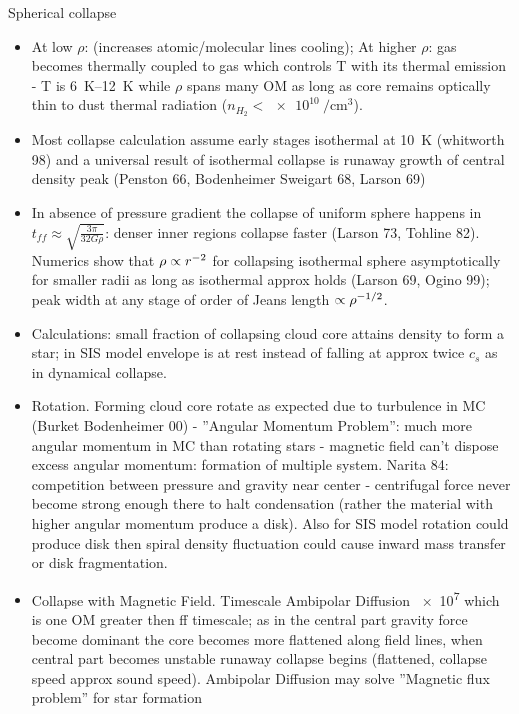 \begin{frame}{Spherical collapse}
    \begin{itemize}
        \item At low $\rho$: \xaumenta{\rho}  (increases atomic/molecular lines cooling); At higher $\rho$: gas becomes thermally coupled to gas which controls T with its thermal emission - T is \SIrange{6}{12}{\kelvin} while $\rho$ spans many OM as long as core remains optically thin to dust thermal radiation ($n_{H_2}<\SI{e10}{\per\cubic\cm}$).
        \item Most collapse calculation assume early stages isothermal at \SI{10}{\kelvin} (whitworth 98) and a universal result of isothermal collapse is runaway growth of central density peak (Penston 66, Bodenheimer Sweigart 68, Larson 69)
        \item In absence of pressure gradient the collapse of uniform sphere happens in $t_{ff}\approx\sqrt{\frac{3\pi}{32G\rho}}$: denser inner regions collapse faster (Larson 73, Tohline 82). Numerics show that $\rho\propto r^{-2}$ for collapsing isothermal sphere asymptotically for smaller radii as long as isothermal approx holds (Larson 69, Ogino 99); peak width at any stage of order of Jeans length $\propto\rho^{-1/2}$.
        \item Calculations: small fraction of collapsing cloud core attains density to form a star; in SIS model envelope is at rest instead of falling at approx twice $c_s$ as in dynamical collapse.
        \item Rotation. Forming cloud core rotate as expected due to turbulence in MC (Burket Bodenheimer 00) - ''Angular Momentum Problem'': much more angular momentum in MC than rotating stars - magnetic field can't dispose excess angular momentum: formation of multiple system. Narita 84: competition between pressure and gravity near center - centrifugal force never become strong enough there to halt condensation (rather the material with higher angular momentum produce a disk). Also for SIS model rotation could produce disk then spiral density fluctuation could cause inward mass transfer or disk fragmentation.
        \item Collapse with Magnetic Field. Timescale Ambipolar Diffusion \SI{e7}{\year} which is one OM greater then ff timescale; as in the central part gravity force become dominant the core becomes more flattened along field lines, when central part becomes unstable runaway collapse begins (flattened, collapse speed approx sound speed). Ambipolar Diffusion may solve ''Magnetic flux problem'' for star formation

    \end{itemize}
\end{frame}

